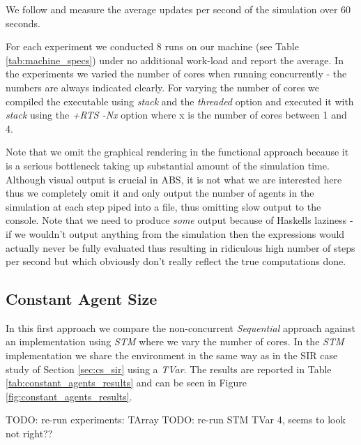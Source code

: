 We follow \cite{lysenko_framework_2008} and measure the average updates per second of the simulation over 60 seconds.

For each experiment we conducted 8 runs on our machine (see Table \ref{tab:machine_specs}) under no additional work-load and report the average. In the experiments we varied the number of cores when running concurrently - the numbers are always indicated clearly. For varying the number of cores we compiled the executable using \textit{stack} and the \textit{threaded} option and executed it with \textit{stack} using the \textit{+RTS -Nx} option where x is the number of cores between 1 and 4.

Note that we omit the graphical rendering in the functional approach because it is a serious bottleneck taking up substantial amount of the simulation time. Although visual output is crucial in ABS, it is not what we are interested here thus we completely omit it and only output the number of agents in the simulation at each step piped into a file, thus omitting slow output to the console. Note that we need to produce \textit{some} output because of Haskells laziness - if we wouldn't output anything from the simulation then the expressions would actually never be fully evaluated thus resulting in ridiculous high number of steps per second but which obviously don't really reflect the true computations done.

\subsection{Constant Agent Size}
In this first approach we compare the non-concurrent \textit{Sequential} approach against an implementation using \textit{STM} where we vary the number of cores. In the \textit{STM} implementation we share the environment in the same way as in the SIR case study of Section \ref{sec:cs_sir} using a \textit{TVar}. The results are reported in Table \ref{tab:constant_agents_results} and can be seen in Figure \ref{fig:constant_agents_results}. 

TODO: re-run experiments: TArray
TODO: re-run STM TVar 4, seems to look not right??  

